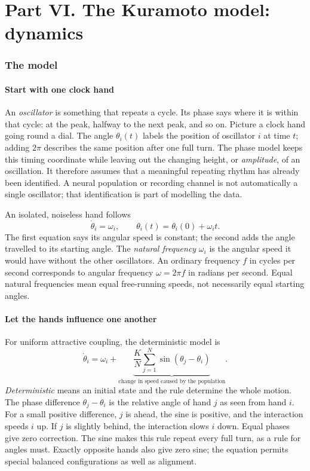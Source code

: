 \documentclass[11pt]{article}
\begin{document}
\part*{Part VI. The Kuramoto model: dynamics}
\section{The model}
\label{sec:kuramoto-walkthrough}

\subsection{Start with one clock hand}

An \emph{oscillator} is something that repeats a cycle. Its phase says where
it is within that cycle: at the peak, halfway to the next peak, and so on.
Picture a clock hand going round a dial. The angle $\theta_i(t)$ labels the
position of oscillator $i$ at time $t$; adding $2\pi$ describes the same
position after one full turn. The phase model keeps this timing coordinate
while leaving out the changing height, or \emph{amplitude}, of an oscillation.
It therefore assumes that a meaningful repeating rhythm has already been
identified. A neural population or recording channel is not automatically a
single oscillator; that identification is part of modelling the data.

An isolated, noiseless hand follows
\[
 \dot\theta_i=\omega_i,\qquad
 \theta_i(t)=\theta_i(0)+\omega_i t.
\]
The first equation says its angular speed is constant; the second adds the
angle travelled to its starting angle. The \emph{natural frequency}
$\omega_i$ is the angular speed it would have without the other oscillators.
An ordinary frequency $f$ in cycles per second corresponds to angular frequency
$\omega=2\pi f$ in radians per second. Equal natural frequencies mean equal
free-running speeds, not necessarily equal starting angles.

\subsection{Let the hands influence one another}

For uniform attractive coupling, the deterministic model is
\[
 \dot\theta_i=\omega_i+
 \underbrace{\frac{K}{N}\sum_{j=1}^{N}
 \sin(\theta_j-\theta_i)}_{\text{change in speed caused by the population}}.
\]
\emph{Deterministic} means an initial state and the rule determine the whole
motion. The phase difference $\theta_j-\theta_i$ is the relative angle of
hand $j$ as seen from hand $i$. For a small positive difference, $j$ is ahead,
the sine is positive, and the interaction speeds $i$ up. If $j$ is slightly
behind, the interaction slows $i$ down. Equal phases give zero correction.
The sine makes this rule repeat every full turn, as a rule for angles must.
Exactly opposite hands also give zero sine; the equation permits special
balanced configurations as well as alignment.
\end{document}
